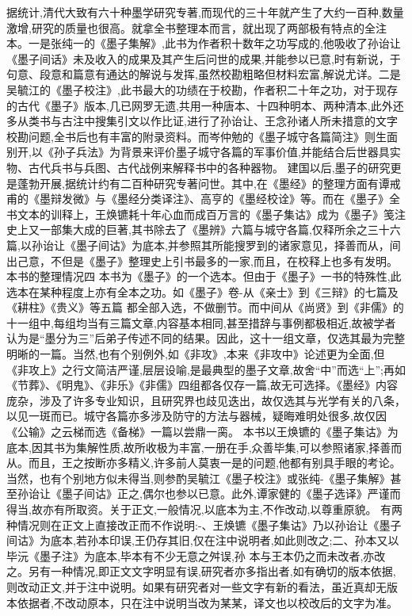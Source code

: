 \documentclass[12pt,UTF8]{ctexbook}
\begin{document}
据统计,清代大致有六十种墨学研究专著,而现代的三十年就产生了大约一百种,数量激增,研究的质量也很高。就拿全书整理本而言，就出现了两部极有特点的全注本。一是张纯一的《墨子集解》,此书为作者积十数年之功写成的,他吸收了孙诒让《墨子间话》未及收入的成果及其产生后问世的成果,并能参以已意,时有新说，于
句意、段意和篇意有通达的解说与发挥,虽然校勘粗略但材料宏富,解说尤详。二是吴毓江的《墨子校注》,此书最大的功绩在于校勘，作者积二十年之功，对于现存的古代《墨子》版本,几已网罗无遗,共用一种唐本、十四种明本、两种清本,此外还多从类书与古注中搜集引文以作比证,进行了孙诒让、王念孙诸人所未措意的文字校勘问题,全书后也有丰富的附录资料。而岑仲勉的《墨子城守各篇简注》则生面别开,以《孙子兵法》为背景来评价墨子城守各篇的军事价值,并能结合后世器具实物、古代兵书与兵图、古代战例来解释书中的各种器物。
建国以后,墨子的研究更是蓬勃开展,据统计约有二百种研究专著问世。其中,在《墨经》的整理方面有谭戒甫的《墨辩发微》与《墨经分类译注》、高亨的《墨经校诠》等。而在《墨子》全书文本的训释上，王焕镳耗十年心血而成百万言的《墨子集诂》成为《墨子》笺注史上又一部集大成的巨著,其书除去了《墨辨》六篇与城守各篇,仅释所余之三十六篇,以孙诒让《墨子间诂》为底本,并参照其所能搜罗到的诸家意见，择善而从，间出己意，不但是《墨子》整理史上引书最多的一家,而且，在校释上也多有发明。
本书的整理情况四
本书为《墨子》的一个选本。但由于《墨子》一书的特殊性,此选本在某种程度上亦有全本之功。如《墨子》卷-从《亲士》到《三辩》的七篇及《耕柱》《贵义》等五篇
都全部入选，不做删节。而中间从《尚贤》到《非儒》的十一组中,每组均当有三篇文章,内容基本相同,甚至措辞与事例都极相近,故被学者认为是“墨分为三”后弟子传述不同的结果。因此，这十一组文章，仅选其最为完整明晰的一篇。当然,也有个别例外,如《非攻》,本来《非攻中》论述更为全面,但《非攻上》之行文简洁严谨,层层设喻,是最典型的墨子文章,故舍“中”而选“上”;再如《节葬》、《明鬼》、《非乐》《非儒》四组都各仅存一篇,故无可选择。《墨经》内容庞杂，涉及了许多专业知识，且研究界也歧见迭出，故仅选其与光学有关的八条，以见一斑而已。城守各篇亦多涉及防守的方法与器械，疑晦难明处很多,故仅因《公输》之云梯而选《备梯》一篇以尝鼎一脔。
本书以王焕镳的《墨子集诂》为底本,因其书为集解性质,故所收极为丰富,一册在手,众善毕集,可以参照诸家,择善而从。而且，王之按断亦多精义,许多前人莫衷一是的问题,他都有别具手眼的考论。当然，也有个别地方似未得当,则参酌吴毓江《墨子校注》或张纯-《墨子集解》甚至孙诒让《墨子间诂》正之,偶尔也参以已意。此外,谭家健的《墨子选译》严谨而得当,故亦有所取资。关于正文,一般情况,以底本为主,不作改动,以尊重原貌。
有两种情况则在正文上直接改正而不作说明:-、王焕镳《墨子集诂》乃以孙诒让《墨子间诂》为底本,若孙本印误,王仍存其旧,仅在注中说明者,如此则改之;二、孙本又以毕沅《墨子注》为底本,毕本有不少无意之舛误,孙
本与王本仍之而未改者,亦改之。另有一种情况,即正文文字明显有误,研究者亦多指出者,如有确切的版本依据,则改动正文,并于注中说明。如果有研究者对一些文字有新的看法，虽近真却无版本依据者,不改动原本，只在注中说明当改为某某，译文也以校改后的文字为准。
\end{document}
